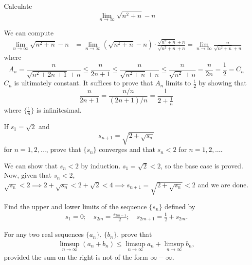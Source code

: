   \begin{exercise}[Rudin 3.2]
    Calculate 
    \[\lim_{n \rightarrow \infty} \sqrt{n^2 + n} - n\]
  \end{exercise}
  \begin{solution}
    We can compute  
    \begin{align*}
        \lim_{n \rightarrow \infty} \sqrt{n^2 + n} - n & = \lim_{n \rightarrow \infty} (\sqrt{n^2 + n} - n) \cdot \frac{\sqrt{n^2 + n} + n}{\sqrt{n^2 + n} + n} = \lim_{n \rightarrow \infty} \frac{n}{\sqrt{n^2 + n} + n}
    \end{align*}
    where 
    \[A_n = \frac{n}{\sqrt{n^2 + 2n + 1} + n} \leq \frac{n}{2n + 1} \leq \frac{n}{\sqrt{n^2 + n} + n} \leq \frac{n}{\sqrt{n^2} + n} = \frac{n}{2n} = \frac{1}{2} = C_n\]
    $C_n$ is ultimately constant. It suffices to prove that $A_n$ limits to $\frac{1}{2}$ by showing that 
    \[\frac{n}{2n + 1} = \frac{n/n}{(2n+1)/n} = \frac{1}{2 + \frac{1}{n}}\]
    where $\{\frac{1}{n}\}$ is infinitesimal. 
  \end{solution}

  \begin{exercise}[Rudin 3.3]
    If $s_1 = \sqrt{2}$ and 
    \[s_{n+1} = \sqrt{2 + \sqrt{s_n}}\]
    for $n = 1, 2, \ldots$, prove that $\{s_n\}$ converges and that $s_n < 2$ for $n = 1, 2, \ldots$. 
  \end{exercise}
  \begin{solution}
    We can show that $s_n < 2$ by induction. $s_1 = \sqrt{2} < 2$, so the base case is proved. Now, given that $s_n < 2$, $\sqrt{s_n} < 2 \implies 2 + \sqrt{s_n} < 2 + \sqrt{2} < 4 \implies s_{n+1} = \sqrt{2 + \sqrt{s_n}} < 2$ and we are done. 
  \end{solution}

  \begin{exercise}[Rudin 3.4]
    Find the upper and lower limits of the sequence $\{s_n\}$ defined by
    \begin{align*}
      s_1 = 0; \quad s_{2m} = \frac{s_{2m-1}}{2}; \quad s_{2m+1} = \frac{1}{2} + s_{2m}.
    \end{align*}
  \end{exercise}
  \begin{solution}
    
  \end{solution}

  \begin{exercise}[Rudin 3.5]
    For any two real sequences $\{a_n\}$, $\{b_n\}$, prove that
    \begin{align*}
      \limsup_{n \to \infty} (a_n + b_n) \leq \limsup_{n \to \infty} a_n + \limsup_{n \to \infty} b_n,
    \end{align*}
    provided the sum on the right is not of the form $\infty - \infty$.
  \end{exercise}
  \begin{solution}
    
  \end{solution}

